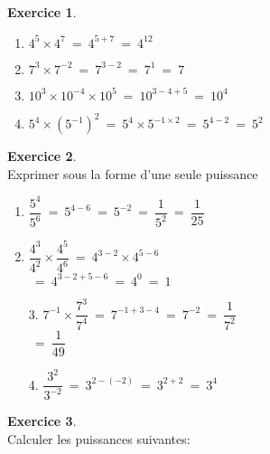 \documentclass[10pt,a4paper]{article}
\theoremstyle{definition}
\theoremstyle{definition}
\newtheorem{exo}{Exercice}
\begin{document}
\begin{center}
\begin{minipage}[c]{0.4\linewidth}
\begin{exo}
			\begin{enumerate}
				\item $4^5 \times 4^7 \ = \ 4^{5+7}  \  =  \  4^{12}$
				\item $7^3 \times 7^{-2} \ = \ 7^{3-2} \ = \ 7^1 \ = \ 7 $
			
				\item $10^3 \times 10^{-4} \times 10^5 \ = \ 10^{3-4+5} \ = \ 10^{4}$
				\item $5^4\times (5^{-1})^2 \ = \ 5^4 \times 5^{-1\times2} \ = \ 5^{4-2} \ = \ 5^2$
			\end{enumerate}
	
	\end{exo}
\begin{exo}\quad\hfill\textbf{}\\
	Exprimer sous la forme d'une seule puissance
	
	\begin{enumerate}
		
		\item $\dfrac{5^4}{5^6} \ = \ 5^{4-6} \ = \ 5^{-2} \ = \ \dfrac{1}{5^2} \ = \ \dfrac{1}{25}$
		\item $\dfrac{4^3}{4^2}\times \dfrac{4^5}{4^6} \ = \ 4^{3-2}\times4^{5-6} $ \\[2mm ] $\ = \ 4^{3-2+5-6} \ = \ 4^{0} \ = \ 1$

	\end{enumerate}
	
\end{exo}
	\end{minipage}
	\hfill\vrule\hfill
	\begin{minipage}[c]{0.4\linewidth}
		\raggedright
		
		
				\begin{enumerate}
		
					\item[3.] $7^{-1}\times \dfrac{7^3}{7^4} \ = \ 7^{-1+3-4} \ = \ 7^{-2}\ = \ \dfrac{1}{7^2} $ \\[2mm] $\ = \ \dfrac{1}{49}$
					\item[4.] $\dfrac{3^2}{3^{-2}} \ = \ 3^{2-(-2)} \ = \ 3^{2+2} \ = \ 3^4$
				\end{enumerate}

	\begin{exo}\quad\\
		Calculer les puissances suivantes:\hfill\textbf{}\\
	
			\begin{enumerate}
				

\end{enumerate}
\end{exo}
\end{minipage}
\end{center}
\end{document}
